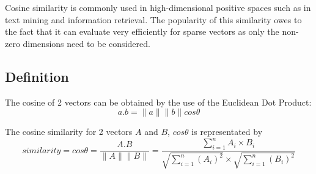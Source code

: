 		Cosine similarity is commonly used in high-dimensional positive spaces such as in text mining and information retrieval. The popularity of this similarity owes to the fact that it can evaluate very efficiently for sparse vectors as only the non-zero dimensions need to be considered.
		
		\subsection{Definition}
			The cosine of 2 vectors can be obtained by the use of the Euclidean Dot Product:
			\[ a . b = \|a\| \|b\| cos \theta \]
			
			The cosine similarity for 2 vectors \(A\) and \(B\), \(cos \theta \) is representated by
			\[ similarity = cos \theta = \frac{A.B}{\|A\|\|B\|} = \frac{\displaystyle\sum_{i=1}^{n} A_i \times B_i}{\sqrt{\displaystyle\sum_{i=1}^{n} (A_i) ^ 2} \times \sqrt{\displaystyle\sum_{i=1}^{n} (B_i) ^ 2}} \]